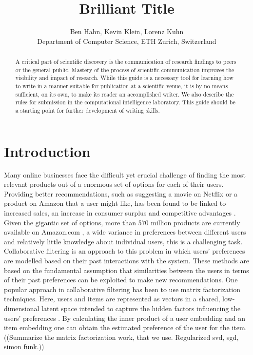 \documentclass[10pt,conference,compsocconf]{IEEEtran}
\begin{document}
\title{Brilliant Title}

\author{
  Ben Hahn, Kevin Klein, Lorenz Kuhn\\
  Department of Computer Science, ETH Zurich, Switzerland
}

\maketitle

\begin{abstract}
  A critical part of scientific discovery is the
  communication of research findings to peers or the general public.
  Mastery of the process of scientific communication improves the
  visibility and impact of research. While this guide is a necessary
  tool for learning how to write in a manner suitable for publication
  at a scientific venue, it is by no means sufficient, on its own, to
  make its reader an accomplished writer. We also describe the rules
  for submission in the computational intelligence laboratory.
  This guide should be a
  starting point for further development of writing skills.
\end{abstract}

\section{Introduction}

Many online businesses face the difficult yet crucial challenge of finding the most relevant products out of a enormous set of options for each of their users. Providing better recommendations, such as suggesting a movie on Netflix or a product on Amazon that a user might like, has been found to be linked to increased sales, an increase in consumer surplus and competitive advantages \cite{hinz2010impact}.
Given the gigantic set of options, more than 570 million products are currently available on Amazon.com \cite{scrap2018}, a wide variance in preferences between different users and relatively little knowledge about individual users, this is a challenging task. Collaborative filtering \cite{sarwar2001item} is an approach to this problem in which users' preferences are modelled based on their past interactions with the system. These methods are based on the fundamental assumption that similarities between the users in terms of their past preferences can be exploited to make new recommendations. 
One popular approach in collaborative filtering has been to use matrix factorization techniques. Here, users and items are represented as vectors in a shared, low-dimensional latent space intended to capture the hidden factors influencing the users' preferences \cite{koren2009matrix}. By calculating the inner product of a user embedding and an item embedding one can obtain the estimated preference of the user for the item. ((Summarize the matrix factorization work, that we use. Regularized svd, sgd, simon funk.))
\end{document}
